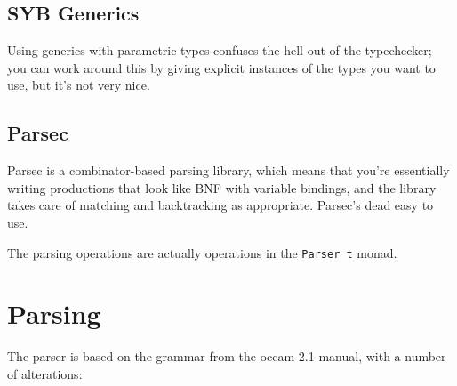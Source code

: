 \documentclass[a4paper,12pt]{article}
\def\occam{{\sffamily occam}\xspace}
\begin{document}
\subsection{SYB Generics}

\cite{syb1}

\label{gen-par-prob} Using generics with parametric types confuses the
hell out of the typechecker; you can work around this by giving explicit
instances of the types you want to use, but it's not very nice.

\subsection{Parsec}

Parsec is a combinator-based parsing library, which means that you're
essentially writing productions that look like BNF with variable
bindings, and the library takes care of matching and backtracking as
appropriate. Parsec's dead easy to use.

The parsing operations are actually operations in the \verb|Parser t|
monad.

\section{Parsing}

The parser is based on the grammar from the \occam 2.1 manual, with a
number of alterations:
\end{document}
